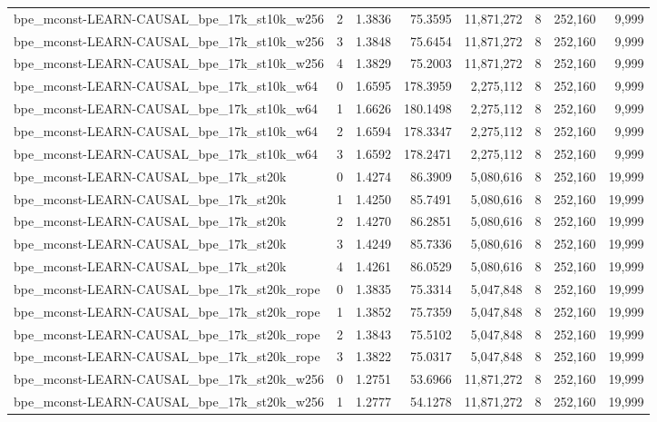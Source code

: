 \begin{tabular}{lrrrrrrr}
bpe\_mconst-LEARN-CAUSAL\_bpe\_17k\_st10k\_w256 & 2 & 1.3836 & 75.3595 & 11,871,272 & 8 & 252,160 & 9,999 \\
bpe\_mconst-LEARN-CAUSAL\_bpe\_17k\_st10k\_w256 & 3 & 1.3848 & 75.6454 & 11,871,272 & 8 & 252,160 & 9,999 \\
bpe\_mconst-LEARN-CAUSAL\_bpe\_17k\_st10k\_w256 & 4 & 1.3829 & 75.2003 & 11,871,272 & 8 & 252,160 & 9,999 \\
bpe\_mconst-LEARN-CAUSAL\_bpe\_17k\_st10k\_w64 & 0 & 1.6595 & 178.3959 & 2,275,112 & 8 & 252,160 & 9,999 \\
bpe\_mconst-LEARN-CAUSAL\_bpe\_17k\_st10k\_w64 & 1 & 1.6626 & 180.1498 & 2,275,112 & 8 & 252,160 & 9,999 \\
bpe\_mconst-LEARN-CAUSAL\_bpe\_17k\_st10k\_w64 & 2 & 1.6594 & 178.3347 & 2,275,112 & 8 & 252,160 & 9,999 \\
bpe\_mconst-LEARN-CAUSAL\_bpe\_17k\_st10k\_w64 & 3 & 1.6592 & 178.2471 & 2,275,112 & 8 & 252,160 & 9,999 \\
bpe\_mconst-LEARN-CAUSAL\_bpe\_17k\_st20k & 0 & 1.4274 & 86.3909 & 5,080,616 & 8 & 252,160 & 19,999 \\
bpe\_mconst-LEARN-CAUSAL\_bpe\_17k\_st20k & 1 & 1.4250 & 85.7491 & 5,080,616 & 8 & 252,160 & 19,999 \\
bpe\_mconst-LEARN-CAUSAL\_bpe\_17k\_st20k & 2 & 1.4270 & 86.2851 & 5,080,616 & 8 & 252,160 & 19,999 \\
bpe\_mconst-LEARN-CAUSAL\_bpe\_17k\_st20k & 3 & 1.4249 & 85.7336 & 5,080,616 & 8 & 252,160 & 19,999 \\
bpe\_mconst-LEARN-CAUSAL\_bpe\_17k\_st20k & 4 & 1.4261 & 86.0529 & 5,080,616 & 8 & 252,160 & 19,999 \\
bpe\_mconst-LEARN-CAUSAL\_bpe\_17k\_st20k\_rope & 0 & 1.3835 & 75.3314 & 5,047,848 & 8 & 252,160 & 19,999 \\
bpe\_mconst-LEARN-CAUSAL\_bpe\_17k\_st20k\_rope & 1 & 1.3852 & 75.7359 & 5,047,848 & 8 & 252,160 & 19,999 \\
bpe\_mconst-LEARN-CAUSAL\_bpe\_17k\_st20k\_rope & 2 & 1.3843 & 75.5102 & 5,047,848 & 8 & 252,160 & 19,999 \\
bpe\_mconst-LEARN-CAUSAL\_bpe\_17k\_st20k\_rope & 3 & 1.3822 & 75.0317 & 5,047,848 & 8 & 252,160 & 19,999 \\
bpe\_mconst-LEARN-CAUSAL\_bpe\_17k\_st20k\_w256 & 0 & 1.2751 & 53.6966 & 11,871,272 & 8 & 252,160 & 19,999 \\
bpe\_mconst-LEARN-CAUSAL\_bpe\_17k\_st20k\_w256 & 1 & 1.2777 & 54.1278 & 11,871,272 & 8 & 252,160 & 19,999 \\

\end{tabular}
